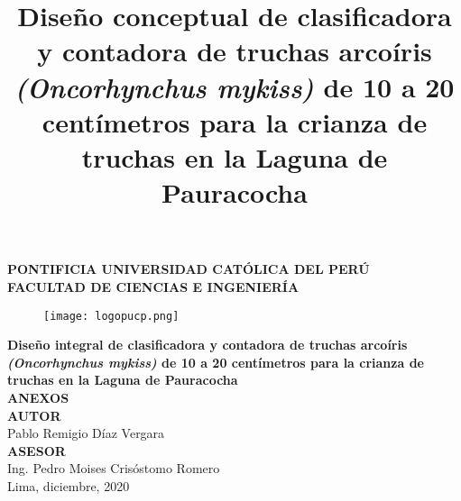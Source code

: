 \clearpage{\pagestyle{empty}\cleardoublepage}
\begin{titlepage}
	\begin{center}
		{\Large \bf PONTIFICIA UNIVERSIDAD CATÓLICA DEL PERÚ}\\
		\vspace{0.8 cm} 
		{\Large \bf FACULTAD DE CIENCIAS E INGENIERÍA}\\
		\vspace{1.75 cm}
		\begin{figure}[H]
			\centering
			\texttt{[image: logopucp.png]}
		\end{figure}
		\vspace{0.25cm}
		
		\title{Diseño conceptual de clasificadora y contadora de truchas arcoíris \textit{(Oncorhynchus mykiss)} de 10 a 20 centímetros para la crianza de truchas en la Laguna de Pauracocha} %
		{\Large \bf Diseño integral de clasificadora y contadora de truchas arcoíris \textit{(Oncorhynchus mykiss)} de 10 a 20 centímetros para la crianza de truchas en la Laguna de Pauracocha}\\ %
		\vspace{0.5cm}
		{\Large \bf ANEXOS}\\[2.0 cm]
		{\large \bf AUTOR}\\[0.5cm]
		{\large Pablo Remigio Díaz Vergara}\\[1.75 cm] %
		{\large \bf ASESOR}\\[0.5 cm] 
		{\large Ing. Pedro Moises Crisóstomo Romero}\\[0.5 cm] %
		\vspace{2.0 cm}
		{\large Lima, diciembre, 2020}
		
	\end{center}
\end{titlepage}